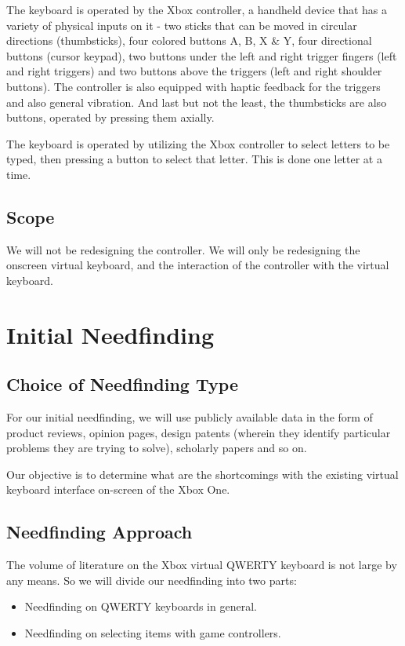 \documentclass[
	letterpaper, %
]{jdf}
\begin{document}
The keyboard is operated by the Xbox controller, a handheld device that has a variety of physical inputs on it - two sticks that can be moved in circular directions (thumbsticks), four colored buttons A, B, X \& Y, four directional buttons (cursor keypad), two buttons under the left and right trigger fingers (left and right triggers) and two buttons above the triggers (left and right shoulder buttons). The controller is also equipped with haptic feedback for the triggers and also general vibration. And last but not the least, the thumbsticks are also buttons, operated by pressing them axially.

The keyboard is operated by utilizing the Xbox controller to select letters to be typed, then pressing a button to select that letter. This is done one letter at a time.

\subsection{Scope}
We will not be redesigning the controller. We will only be redesigning the onscreen virtual keyboard, and the interaction of the controller with the virtual keyboard.

\section{Initial Needfinding}
\subsection{Choice of Needfinding Type}
For our initial needfinding, we will use publicly available data in the form of product reviews, opinion pages, design patents (wherein they identify particular problems they are trying to solve), scholarly papers and so on.

Our objective is to determine what are the shortcomings with the existing virtual keyboard interface on-screen of the Xbox One. 

\subsection{Needfinding Approach}
The volume of literature on the Xbox virtual QWERTY keyboard is not large by any means. So we will divide our needfinding into two parts:
\begin{itemize}
    \item Needfinding on QWERTY keyboards in general.
    \item Needfinding on selecting items with game controllers.
\end{itemize}
\end{document}
